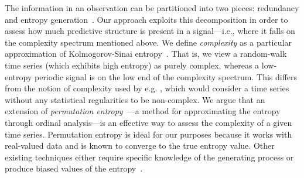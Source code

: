 \documentclass[%
pre,
reprint,
superscriptaddress,
showpacs,
nofootinbib,
nobibnotes,
 amsmath,amssymb,
 aps,
]{revtex4-1}
\begin{document}

The information in an observation can be partitioned into two pieces:
redundancy and entropy generation~\cite{crutchfield2003}.
\label{page:redundancy}
Our approach exploits this decomposition in order to assess how much
predictive structure is present in a signal---i.e., where it falls on
the complexity spectrum mentioned above.  We define \emph{complexity}
as a particular approximation of Kolmogorov-Sinai
entropy~\cite{lind95}.  That is, we view a random-walk time series
(which exhibits high entropy) as purely complex, whereas a low-entropy
periodic signal is on the low end of the complexity spectrum.  This
differs from the notion of complexity used by e.g. \cite{Shalizi2008},
which would consider a time series without any statistical
regularities to be non-complex.  We argue that an extension of
\emph{permutation entropy}~\cite{bandt2002per}---a method for
approximating the entropy through ordinal analysis---is an effective
way to assess the complexity of a given time series.  Permutation
entropy is ideal for our purposes because it works with real-valued
data and is known to converge to the true entropy value. Other
existing techniques either require specific knowledge of the
generating process or produce biased values of the
entropy~\cite{bollt2001}.
\end{document}
